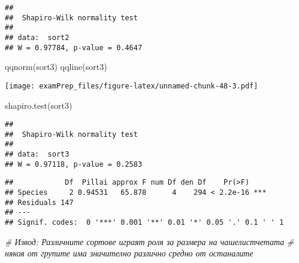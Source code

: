 \documentclass[
]{article}
\newenvironment{Shaded}{\begin{snugshade}}{\end{snugshade}}
\newcommand{\AttributeTok}[1]{\textcolor[rgb]{0.77,0.63,0.00}{#1}}
\newcommand{\CommentTok}[1]{\textcolor[rgb]{0.56,0.35,0.01}{\textit{#1}}}
\newcommand{\FunctionTok}[1]{\textcolor[rgb]{0.00,0.00,0.00}{#1}}
\newcommand{\NormalTok}[1]{#1}
\newcommand{\SpecialCharTok}[1]{\textcolor[rgb]{0.00,0.00,0.00}{#1}}
\begin{document}
\begin{verbatim}
## 
##  Shapiro-Wilk normality test
## 
## data:  sort2
## W = 0.97784, p-value = 0.4647
\end{verbatim}

\begin{Shaded}
\begin{Highlighting}[]
\FunctionTok{qqnorm}\NormalTok{(sort3)}
\FunctionTok{qqline}\NormalTok{(sort3)}
\end{Highlighting}
\end{Shaded}

\texttt{[image: examPrep\_files/figure-latex/unnamed-chunk-48-3.pdf]}

\begin{Shaded}
\begin{Highlighting}[]
\FunctionTok{shapiro.test}\NormalTok{(sort3)}
\end{Highlighting}
\end{Shaded}

\begin{verbatim}
## 
##  Shapiro-Wilk normality test
## 
## data:  sort3
## W = 0.97118, p-value = 0.2583
\end{verbatim}

\begin{Shaded}
\end{Shaded}

\begin{verbatim}
##            Df  Pillai approx F num Df den Df    Pr(>F)    
## Species     2 0.94531   65.878      4    294 < 2.2e-16 ***
## Residuals 147                                             
## ---
## Signif. codes:  0 '***' 0.001 '**' 0.01 '*' 0.05 '.' 0.1 ' ' 1
\end{verbatim}

\begin{Shaded}
\begin{Highlighting}[]
  \CommentTok{\# Извод: Различните сортове играят роля за размера на чашелистчетата}
  \CommentTok{\# някоя от групите има значително различно средно от останалите}
\end{Highlighting}
\end{Shaded}
\end{document}
